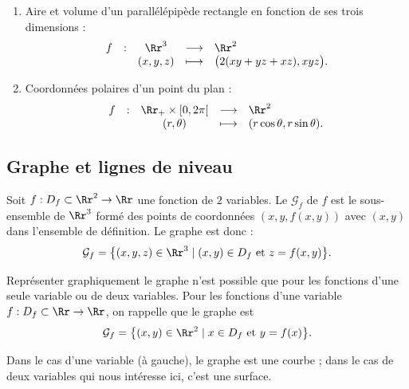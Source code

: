 \documentclass[11pt, class=report,crop=false]{standalone}
\begin{document}
\begin{exemple}
\sauteligne
\begin{enumerate}
\item Aire et volume d'un parallélépipède rectangle en fonction de ses trois dimensions :
$$\begin{array}{ccccl}f&:&\Rr^3& \longrightarrow &\Rr^2\\ &&(x,y,z)&\longmapsto &\big(2(xy+yz+xz),xyz\big).\end{array}$$

\item Coordonnées polaires d'un point du plan :
$$\begin{array}{ccccl}f&:&\Rr_+\times [0,2\pi[&\longrightarrow &\Rr^2\\ &&(r,\theta)&\longmapsto &(r\cos \theta ,r\sin \theta ).\end{array}$$
\end{enumerate}
\end{exemple}



\subsection{Graphe et lignes de niveau}



\begin{definition}
Soit $f : D_f \subset \Rr^2 \to \Rr$ une fonction de $2$ variables. 
Le  $\mathcal{G}_f$ de $f$ est le sous-ensemble de $\Rr^3$ formé des points de coordonnées $(x,y,f(x,y))$ avec $(x,y)$ dans l'ensemble de définition. Le graphe est donc :
$$\mathcal{G}_f= \big\{ (x,y,z)\in \Rr^3 \mid (x,y)\in D_f \text{ et } z=f(x,y)\big\}.$$
\end{definition}

Représenter graphiquement le graphe n'est possible que pour les fonctions d'une seule variable ou de deux variables. 
Pour les fonctions d'une variable $f: D_f \subset \Rr \to \Rr$, on rappelle que le graphe est 
$$\mathcal{G}_f = \big\{ (x,y)\in \Rr^2 \mid x \in D_f \text{ et } y=f(x)\big\}.$$


Dans le cas d'une variable (à gauche), le graphe est une courbe ; dans le cas de deux variables qui nous intéresse ici, c'est une surface.

\begin{center}
\begin{minipage}{0.4\textwidth}
\end{minipage}
\begin{minipage}{0.4\textwidth}
\end{minipage}
\end{center}
\end{document}
